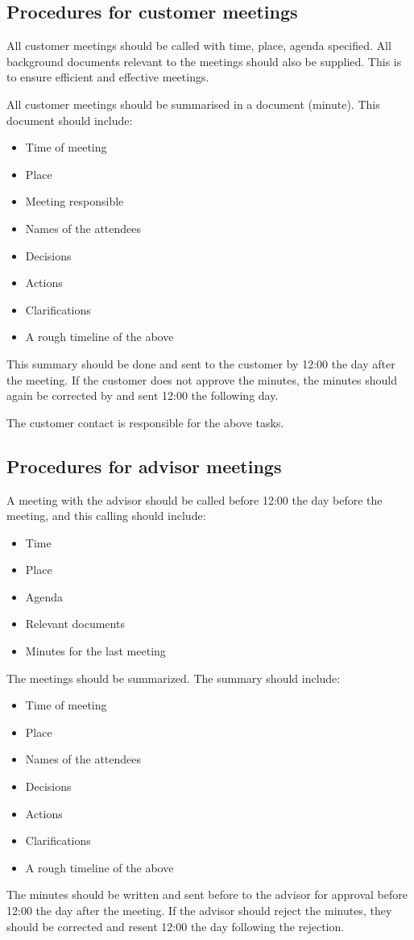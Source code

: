 \subsection{Procedures for customer meetings}
All customer meetings should be called with time, place, agenda specified. All background documents relevant to the meetings should also be supplied. This is to ensure efficient and effective meetings.

All customer meetings should be summarised in a document (minute). This document should include:
\begin{itemize}
	\item Time of meeting
	\item Place
	\item Meeting responsible
	\item Names of the attendees
	\item Decisions
	\item Actions
	\item Clarifications
	\item A rough timeline of the above
\end{itemize}

This summary should be done and sent to the customer by 12:00 the day after the meeting. If the customer does not approve the minutes, the minutes should again be corrected by and sent 12:00 the following day.

The customer contact is responsible for the above tasks.

\subsection{Procedures for advisor meetings}
A meeting with the advisor should be called before 12:00 the day before the meeting, and this calling should include:
\begin{itemize}
	\item Time
	\item Place
	\item Agenda
	\item Relevant documents
	\item Minutes for the last meeting
\end{itemize}
The meetings should be summarized. The summary should include:
\begin{itemize}
	\item Time of meeting
	\item Place
	\item Names of the attendees
	\item Decisions
	\item Actions
	\item Clarifications
	\item A rough timeline of the above
\end{itemize}
The minutes should be written and sent before to the advisor for approval before 12:00 the day after the meeting. If the advisor should reject the minutes, they should be corrected and resent 12:00 the day following the rejection.

